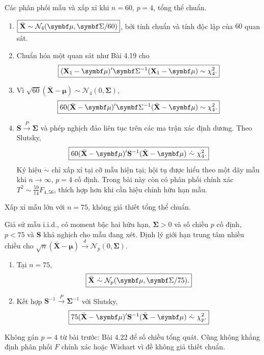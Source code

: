 \begin{problem}[Bài 4.21.]
Các phân phối mẫu và xấp xỉ khi $n=60$, $p=4$, tổng thể chuẩn.
\end{problem}
\begin{solution}
\begin{enumerate}[label=\textbf{\alph*)}]
\item $\answer{\bar{\mathbf X}\sim\mathcal N_4(\boldsymbol\mu,\boldsymbol\Sigma/60)}$,
 bởi tính chuẩn và tính độc lập của $60$ quan sát.
\item Chuẩn hóa một quan sát như Bài 4.19 cho
\[
\answer{(\mathbf X_1-\boldsymbol\mu)'\boldsymbol\Sigma^{-1}
(\mathbf X_1-\boldsymbol\mu)\sim\chi_4^2.}
\]
\item Vì $\sqrt{60}(\bar{\mathbf X}-\boldsymbol\mu)\sim\mathcal N_4(0,\boldsymbol\Sigma)$,
\[
\answer{60(\bar{\mathbf X}-\boldsymbol\mu)'\boldsymbol\Sigma^{-1}
(\bar{\mathbf X}-\boldsymbol\mu)\sim\chi_4^2.}
\]
\item $\mathbf S\xrightarrow{P}\boldsymbol\Sigma$ và phép nghịch đảo liên tục
trên các ma trận xác định dương. Theo Slutsky,
\[
\answer{60(\bar{\mathbf X}-\boldsymbol\mu)'\mathbf S^{-1}
(\bar{\mathbf X}-\boldsymbol\mu)\ \dot\sim\ \chi_4^2.}
\]
Ký hiệu $\dot\sim$ chỉ xấp xỉ tại cỡ mẫu hiện tại; hội tụ được hiểu theo
một dãy mẫu khi $n\to\infty$, $p=4$ cố định. Trong bài này còn có phân phối
chính xác $T^2\sim\frac{59}{14}F_{4,56}$, thích hợp hơn khi cần hiệu chỉnh hữu hạn mẫu.
\end{enumerate}
\end{solution}

\begin{problem}[Bài 4.22.]
Xấp xỉ mẫu lớn với $n=75$, không giả thiết tổng thể chuẩn.
\end{problem}
\begin{solution}
Giả sử mẫu i.i.d., có moment bậc hai hữu hạn, $\boldsymbol\Sigma>0$ và số chiều
$p$ cố định, $p<75$ và $\mathbf S$ khả nghịch cho mẫu đang xét.
Định lý giới hạn trung tâm nhiều chiều cho
$\sqrt n(\bar{\mathbf X}-\boldsymbol\mu)\xrightarrow d\mathcal N_p(0,\boldsymbol\Sigma)$.
\begin{enumerate}[label=\textbf{\alph*)}]
\item Tại $n=75$,
\[
\answer{\bar{\mathbf X}\ \dot\sim\ \mathcal N_p(\boldsymbol\mu,\boldsymbol\Sigma/75).}
\]
\item Kết hợp $\mathbf S^{-1}\xrightarrow P\boldsymbol\Sigma^{-1}$ với Slutsky,
\[
\answer{75(\bar{\mathbf X}-\boldsymbol\mu)'\mathbf S^{-1}
(\bar{\mathbf X}-\boldsymbol\mu)\ \dot\sim\ \chi_p^2.}
\]
\end{enumerate}
Không gán $p=4$ từ bài trước: Bài 4.22 để số chiều tổng quát. Cũng không
khẳng định phân phối $F$ chính xác hoặc Wishart vì đề không giả thiết chuẩn.
\end{solution}
